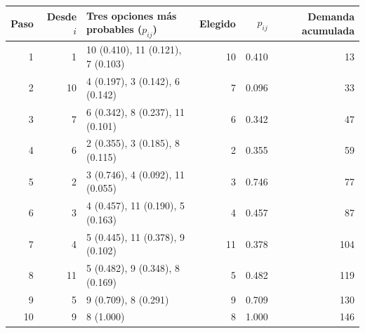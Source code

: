 \begin{tabular}{rrlrrr}\toprule
Paso & Desde $i$ & Tres opciones más probables ($p_{ij}$) & Elegido & $p_{ij}$ & Demanda acumulada\\\midrule
1 & 1 & 10 (0.410), 11 (0.121), 7 (0.103) & 10 & 0.410 & 13\\
2 & 10 & 4 (0.197), 3 (0.142), 6 (0.142) & 7 & 0.096 & 33\\
3 & 7 & 6 (0.342), 8 (0.237), 11 (0.101) & 6 & 0.342 & 47\\
4 & 6 & 2 (0.355), 3 (0.185), 8 (0.115) & 2 & 0.355 & 59\\
5 & 2 & 3 (0.746), 4 (0.092), 11 (0.055) & 3 & 0.746 & 77\\
6 & 3 & 4 (0.457), 11 (0.190), 5 (0.163) & 4 & 0.457 & 87\\
7 & 4 & 5 (0.445), 11 (0.378), 9 (0.102) & 11 & 0.378 & 104\\
8 & 11 & 5 (0.482), 9 (0.348), 8 (0.169) & 5 & 0.482 & 119\\
9 & 5 & 9 (0.709), 8 (0.291) & 9 & 0.709 & 130\\
10 & 9 & 8 (1.000) & 8 & 1.000 & 146\\
\bottomrule\end{tabular}

